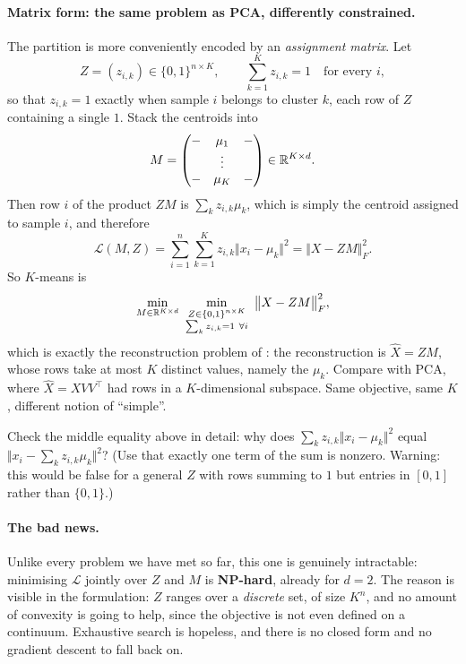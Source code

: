 \paragraph{Matrix form: the same problem as PCA, differently constrained.}
The partition is more conveniently encoded by an \emph{assignment matrix}. Let
\[
Z = (z_{i,k}) \in \{0, 1\}^{n \times K} , \qquad
\sum_{k=1}^K z_{i,k} = 1 \quad \text{for every } i ,
\]
so that $z_{i,k} = 1$ exactly when sample $i$ belongs to cluster $k$, each row of $Z$
containing a single $1$. Stack the centroids into
\[
M = \begin{pmatrix} - & \mu_1 & - \\ & \vdots & \\ - & \mu_K & - \end{pmatrix}
\in \mathbb{R}^{K \times d} .
\]
Then row $i$ of the product $ZM$ is $\sum_k z_{i,k} \mu_k$, which is simply the centroid
assigned to sample $i$, and therefore
\[
\mathcal{L}(M, Z)
= \sum_{i=1}^n \sum_{k=1}^K z_{i,k} \big\Vert x_i - \mu_k \big\Vert^2
= \big\Vert X - Z M \big\Vert_F^2 .
\]
So $K$-means is
\[
\min_{M \in \R^{K \times d}} \ \min_{\substack{Z \in \{0,1\}^{n \times K} \\ \sum_k z_{i,k} = 1 \ \forall i}}
\ \big\Vert X - Z M \big\Vert_F^2 ,
\]
which is exactly the reconstruction problem of : the
reconstruction is $\hat X = ZM$, whose rows take at most $K$ distinct values, namely the
$\mu_k$. Compare with PCA, where $\hat X = X V V^\top$ had rows in a $K$-dimensional
subspace. Same objective, same $K$, different notion of ``simple''.

\begin{exercise}[$\star$]
Check the middle equality above in detail: why does $\sum_k z_{i,k}\Vert x_i -
\mu_k\Vert^2$ equal $\Vert x_i - \sum_k z_{i,k}\mu_k\Vert^2$? (Use that exactly one term
of the sum is nonzero. Warning: this would be false for a general $Z$ with rows summing
to $1$ but entries in $[0,1]$ rather than $\{0,1\}$.)
\end{exercise}

\paragraph{The bad news.}
Unlike every problem we have met so far, this one is genuinely intractable: minimising
$\mathcal{L}$ jointly over $Z$ and $M$ is \textbf{NP-hard}, already for $d = 2$. The
reason is visible in the formulation: $Z$ ranges over a \emph{discrete} set, of size
$K^n$, and no amount of convexity is going to help, since the objective is not even
defined on a continuum. Exhaustive search is hopeless, and there is no closed form and
no gradient descent to fall back on.

